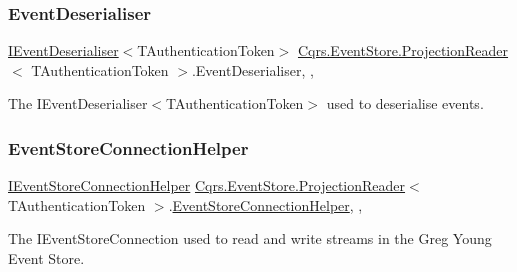 \subsubsection{\texorpdfstring{Event\+Deserialiser}{EventDeserialiser}}
{\footnotesize\ttfamily \hyperlink{interfaceCqrs_1_1EventStore_1_1IEventDeserialiser}{I\+Event\+Deserialiser}$<$T\+Authentication\+Token$>$ \hyperlink{classCqrs_1_1EventStore_1_1ProjectionReader}{Cqrs.\+Event\+Store.\+Projection\+Reader}$<$ T\+Authentication\+Token $>$.Event\+Deserialiser\hspace{0.3cm}{\ttfamily [get]}, {\ttfamily [set]}, {\ttfamily [protected]}}



The I\+Event\+Deserialiser$<$\+T\+Authentication\+Token$>$ used to deserialise events. 

\mbox{\label{classCqrs_1_1EventStore_1_1ProjectionReader_ab169b1404cc40751c3a71c772ed0eaa4_ab169b1404cc40751c3a71c772ed0eaa4}} 
\subsubsection{\texorpdfstring{Event\+Store\+Connection\+Helper}{EventStoreConnectionHelper}}
{\footnotesize\ttfamily \hyperlink{interfaceCqrs_1_1EventStore_1_1IEventStoreConnectionHelper}{I\+Event\+Store\+Connection\+Helper} \hyperlink{classCqrs_1_1EventStore_1_1ProjectionReader}{Cqrs.\+Event\+Store.\+Projection\+Reader}$<$ T\+Authentication\+Token $>$.\hyperlink{classCqrs_1_1EventStore_1_1EventStoreConnectionHelper}{Event\+Store\+Connection\+Helper}\hspace{0.3cm}{\ttfamily [get]}, {\ttfamily [set]}, {\ttfamily [protected]}}



The I\+Event\+Store\+Connection used to read and write streams in the Greg Young Event Store. 

